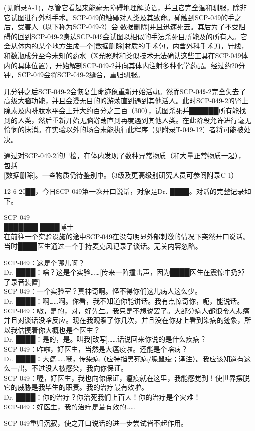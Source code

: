  (见附录A-1)，尽管它看起来能毫无障碍地理解英语，并且它完全温和驯服，除非它试图进行外科手术。SCP-049的触碰对人类及其致命。碰触到SCP-049的手之后，受害人（以下称为SCP-049-2）会{[}数据删除]并且迅速死去。其后为了不受阻碍的回到SCP-049-2身边SCP-049会试图以相似的手法杀死目所能及的所有人。它会从体内的某个地方生成一个{[}数据删除]材质的手术包，内含外科手术刀，针线，和数瓶成分至今未知的药水（X光照射和类似技术无法确认这些工具在SCP-049体内的具体位置），开始解剖SCP-049-2并向其体内注射多种化学药品。经过约20分钟，SCP-049会将SCP-049-2缝合，重归驯服。

几分钟之后SCP-049-2会恢复生命迹象重新开始活动。然而SCP-049-2完全失去了高级大脑功能，并且会漫无目的的游荡直到遇到其他活人。此时SCP-049-2的肾上腺素及内啡肽水平会上升大约百分之三百（300），试图杀死并██████所有能找到的人类，然后重新开始无脑游荡直到再度遇到其他人类。在此阶段允许进行毫无怜悯的抹消。在实验以外的场合未能执行此程序（见附录T-049-12）者将可能被处决。

通过对SCP-049-2的尸检，在体内发现了数种异常物质（和大量正常物质一起），包括{[}数据删除]。一些物质仍待鉴别中。（3级及更高级别研究人员可参阅附录C-1）

12-6-20██，今日SCP-049第一次开口说话，对象是Dr. ████。对话的完整记录如下。

 SCP-049\\
███████ ████博士\\
在前往一个实验设施的途中SCP-049在没有明显外部刺激的情况下突然开口说话。当时████医生通过一个手持麦克风记录了谈话。无关内容忽略。

\begin{scpbox}

SCP-049：这是个哪儿啊？\\
Dr. ████：啥？这是个实验……{[}传来一阵撞击声，因为████医生在震惊中扔掉了录音装置]\\
SCP-049：一个实验室？真神奇啊。怪不得你们这儿病人这么少。\\
Dr. ████：啊……啊。你看，我不知道你能讲话。我有点惊奇你，呃，能说话。\\
SCP-049：嗷，是的，对，好先生。我只是不想说罢了。大部分病人都很令人悲痛并且对谈话没啥反应。现在我观察了你几次，并且没在你身上看到染病的迹象，所以我估摸着你大概也是个医生？\\
Dr. ████：是的，是。叫我{[}改写]……话说回来你说的是什么疾病？\\
SCP-049：咋啦，好医生，当然是大瘟疫啦。还能是个啥病？\\
Dr. ████：大瘟……哦，传染病（应特指黑死病\slash 腺鼠疫；译注）。我应该知道有这么一出。不过没人被感染，我向你保证。\\
SCP-049：喔，好医生，我也向你保证，瘟疫就在这里，我能感觉到！使世界摆脱它的威胁是我毕生的职责。我的治疗最有效啦。\\
Dr. ████：你的治疗？你治死我们上百人！你的治疗是个灾难！\\
SCP-049：好医生，我的治疗是最有效的……

SCP-049重归沉寂，使之开口说话的进一步尝试皆不起作用。

\end{scpbox}

